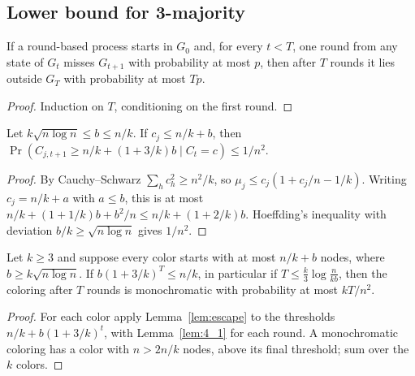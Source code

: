 \subsection{Lower bound for 3-majority}

\begin{lemma}\label{lem:escape}
  \leanok
  If a round-based process starts in $G_0$ and, for every $t < T$, one round
  from any state of $G_t$ misses $G_{t+1}$ with probability at most $p$, then
  after $T$ rounds it lies outside $G_T$ with probability at most $Tp$.
\end{lemma}

\begin{proof}
  \leanok
  Induction on $T$, conditioning on the first round.
\end{proof}

\begin{lemma}[Lemma 4.1]\label{lem:4_1}
  \leanok
  Let $k\sqrt{n\log n} \le b \le n/k$. If $c_j \le n/k + b$, then
  $\Pr(C_{j,t+1} \ge n/k + (1 + 3/k)b \mid C_t = c) \le 1/n^2$.
\end{lemma}

\begin{proof}
  \leanok
  By Cauchy--Schwarz $\sum_h c_h^2 \ge n^2/k$, so
  $\mu_j \le c_j(1 + c_j/n - 1/k)$. Writing $c_j = n/k + a$ with $a \le b$,
  this is at most $n/k + (1+1/k)b + b^2/n \le n/k + (1+2/k)b$. Hoeffding's
  inequality with deviation $b/k \ge \sqrt{n\log n}$ gives $1/n^2$.
\end{proof}

\begin{theorem}\label{thm:4_2}
  \leanok
  Let $k \ge 3$ and suppose every color starts with at most $n/k + b$ nodes,
  where $b \ge k\sqrt{n\log n}$. If $b(1 + 3/k)^T \le n/k$, in particular if
  $T \le \frac k3 \log\frac{n}{kb}$, then the coloring after $T$ rounds is
  monochromatic with probability at most $kT/n^2$.
\end{theorem}

\begin{proof}
  \leanok
  For each color apply Lemma~\ref{lem:escape} to the thresholds
  $n/k + b(1+3/k)^t$, with Lemma~\ref{lem:4_1} for each round. A
  monochromatic coloring has a color with $n > 2n/k$ nodes, above its final
  threshold; sum over the $k$ colors.
\end{proof}

